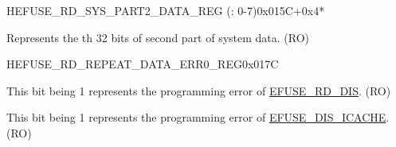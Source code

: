     \begin{register}{H}{EFUSE\_RD\_SYS\_PART2\_DATA\_REG (: 0-7)}{0x015C+0x4*}\label{regdesc:EFUSERDSYSPART2DATANREG}
    \regnewline%
    \begin{regdesc}\begin{reglist}
    \label{fielddesc:EFUSESYSDATAPART2N}\item [EFUSE\_SYS\_DATA\_PART2\_\regindex{n}] Represents the th 32 bits of second part of system data. (RO)
    \end{reglist}\end{regdesc}
    \end{register}


    \begin{register}{H}{EFUSE\_RD\_REPEAT\_DATA\_ERR0\_REG}{0x017C}\label{regdesc:EFUSERDREPEATDATAERR0REG}
    \regnewline%
    \begin{regdesc}\begin{reglist}
    \label{fielddesc:EFUSERDDISERR}\item [EFUSE\_RD\_DIS\_ERR] This bit being 1 represents the programming error of \hyperref[fielddesc:EFUSERDDIS]{EFUSE\_RD\_DIS}. (RO)
    \label{fielddesc:EFUSEDISICACHEERR}\item [EFUSE\_DIS\_ICACHE\_ERR] This bit being 1 represents the programming error of \hyperref[fielddesc:EFUSEDISICACHE]{EFUSE\_DIS\_ICACHE}. (RO)

\end{reglist}
\end{regdesc}
\end{register}
